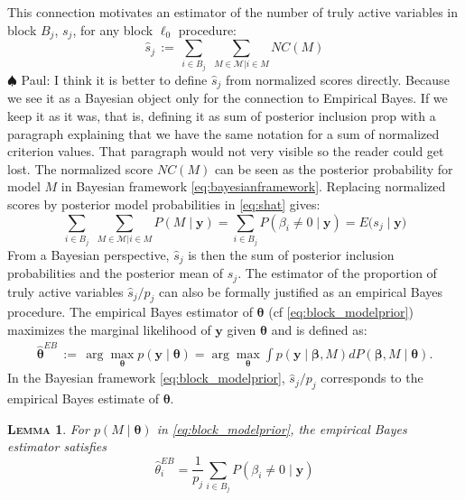 \documentclass[aos]{imsart}
\theoremstyle{plain}
\newtheorem{lem}{\textsc{Lemma}}[section]
\newcommand{\paul}[1]{{\small{\color{green} \sf $\spadesuit$ Paul: #1}}}
\newcommand{\M}{\mathcal{M}}
\newcommand{\bs}{\boldsymbol}
\begin{document}
This connection motivates an estimator of the number of truly active variables in block $B_j$, $s_j$, for any block $\ell_0$ procedure:
\begin{equation}\label{eq:shat}
    \widehat{s}_j \,:=\, \sum_{i\in B_j}\,\,\sum_{M\in \M | i \in M}NC(M)
\end{equation}
\paul{I think it is better to define $\widehat{s}_j$ from normalized scores directly. Because we see it as a Bayesian object only for the connection to Empirical Bayes. If we keep it as it was, that is, defining it as sum of posterior inclusion prop with a paragraph explaining that we have the same notation for a sum of normalized criterion values. That paragraph would not very visible so the reader could get lost.}
The normalized score $NC(M)$ can be seen as the posterior probability for model $M$ in Bayesian framework \eqref{eq:bayesianframework}. Replacing normalized scores  by posterior model probabilities in \eqref{eq:shat} gives:
\begin{equation*}
    \sum_{i\in B_j}\,\,\sum_{M\in \M | i \in M}P(M\mid \bs y) = \sum_{i\in B_j}P(\beta_i \neq 0 \mid \bs y) = E\Big(s_j \mid \bs y\Big)
\end{equation*}
From a Bayesian perspective, $\widehat{s}_j$ is then the sum of posterior inclusion probabilities and the posterior mean of $s_j$. The estimator of the proportion of truly active variables $\widehat{s}_j/p_j$ can also be formally justified as an empirical Bayes procedure. The empirical Bayes estimator of $\bs \theta$ (cf \eqref{eq:block_modelprior}) maximizes the marginal likelihood of $\bs y$ given $\bs \theta$ and is defined as:
\begin{align}
\hat{\bs \theta}^{EB}\,:=\, \arg\max_{\bs \theta} p(\bs y \mid \bs \theta)=
\arg\max_{\bs \theta} \int p(\bs y \mid \bs \beta, M) d P(\bs \beta, M \mid \bs \theta).
\nonumber
\end{align}
 In the Bayesian framework \eqref{eq:block_modelprior}, $\widehat{s}_j/p_j$ corresponds to the empirical Bayes estimate of $\bs \theta$.
\begin{lem}\label{lem:empiricalbayesinterpret} For $p(M \mid \bs \theta)$ in \eqref{eq:block_modelprior}, the empirical Bayes estimator satisfies $$\hat{\theta}^{EB}_i = \frac{1}{p_j}\sum_{i\in B_j}P(\beta_i \neq 0 \mid \bs y)$$
\end{lem}
\end{document}
